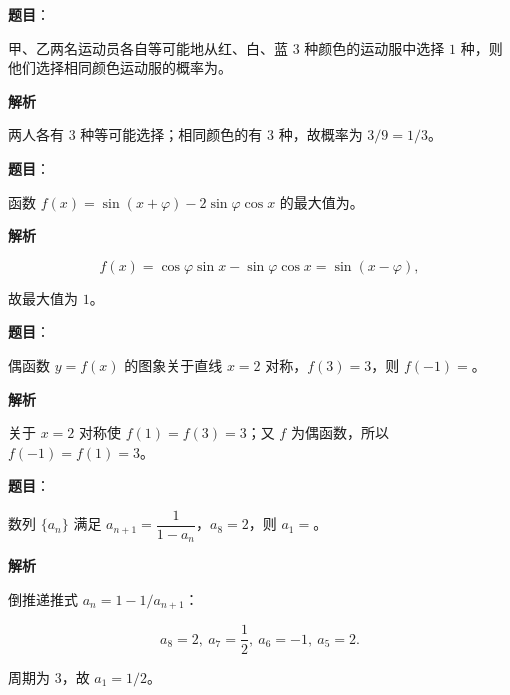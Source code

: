 \begin{answer}

\textbf{题目}：

甲、乙两名运动员各自等可能地从红、白、蓝 $3$ 种颜色的运动服中选择 $1$ 种，则他们选择相同颜色运动服的概率为\gkblank{}。

\textbf{解析}

两人各有 $3$ 种等可能选择；相同颜色的有 $3$ 种，故概率为 $3/9=1/3$。


\end{answer}
\begin{answer}

\textbf{题目}：

函数 $f(x)=\sin(x+\varphi)-2\sin\varphi\cos x$ 的最大值为\gkblank{}。

\textbf{解析}

\nopagebreak[4]
\[
f(x)=\cos\varphi\sin x-\sin\varphi\cos x=\sin(x-\varphi),
\]

故最大值为 $1$。


\end{answer}
\begin{answer}

\textbf{题目}：

偶函数 $y=f(x)$ 的图象关于直线 $x=2$ 对称，$f(3)=3$，则 $f(-1)=$\gkblank{}。

\textbf{解析}

关于 $x=2$ 对称使 $f(1)=f(3)=3$；又 $f$ 为偶函数，所以 $f(-1)=f(1)=3$。


\end{answer}
\begin{answer}

\textbf{题目}：

数列 $\{a_n\}$ 满足 $a_{n+1}=\dfrac1{1-a_n}$，$a_8=2$，则 $a_1=$\gkblank{}。

\textbf{解析}

倒推递推式 $a_n=1-1/a_{n+1}$：

\nopagebreak[4]
\[
a_8=2,\ a_7=\frac12,\ a_6=-1,\ a_5=2.
\]

周期为 $3$，故 $a_1=1/2$。


\end{answer}

